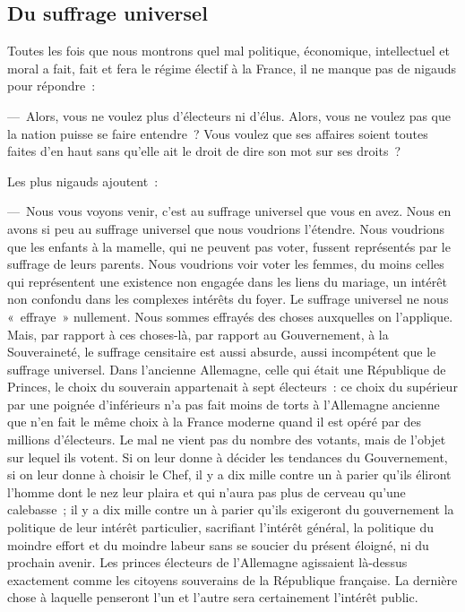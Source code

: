 \documentclass[french,twoside]{book} %
\begin{document}
\subsection[Du suffrage universel]{Du suffrage universel}
\noindent Toutes les fois que nous montrons quel mal politique, économique, intellectuel et moral a fait, fait et fera le régime électif à la France, il ne manque pas de nigauds pour répondre :\par
— Alors, vous ne voulez plus d’électeurs ni d’élus. Alors, vous ne voulez pas que la nation puisse se faire entendre ? Vous voulez que ses affaires soient toutes faites d’en haut sans qu’elle ait le droit de dire son mot sur ses droits ?\par
Les plus nigauds ajoutent :\par
— Nous vous voyons venir, c’est au suffrage universel que vous en avez. Nous en avons si peu au suffrage universel que nous voudrions l’étendre. Nous voudrions que les enfants à la mamelle, qui ne peuvent pas voter, fussent représentés par le suffrage de leurs parents. Nous voudrions voir voter les femmes, du moins celles qui représentent une existence non engagée dans les liens du mariage, un intérêt non confondu dans les complexes intérêts du foyer. Le suffrage universel ne nous « effraye » nullement. Nous sommes effrayés des choses auxquelles on l’applique. Mais, par rapport à ces choses-là, par rapport au Gouvernement, à la Souveraineté, le suffrage censitaire est aussi absurde, aussi incompétent que le suffrage universel. Dans l’ancienne Allemagne, celle qui était une République de Princes, le choix du souverain appartenait à sept électeurs : ce choix du supérieur par une poignée d’inférieurs n’a pas fait moins de torts à l’Allemagne ancienne que n’en fait le même choix à la France moderne quand il est opéré par des millions d’électeurs. Le mal ne vient pas du nombre des votants, mais de l’objet sur lequel ils votent. Si on leur donne à décider les tendances du Gouvernement, si on leur donne à choisir le Chef, il y a dix mille contre un à parier qu’ils éliront l’homme dont le nez leur plaira et qui n’aura pas plus de cerveau qu’une calebasse ; il y a dix mille contre un à parier qu’ils exigeront du gouvernement la politique de leur intérêt particulier, sacrifiant l’intérêt général, la politique du moindre effort et du moindre labeur sans se soucier du présent éloigné, ni du prochain avenir. Les princes électeurs de l’Allemagne agissaient là-dessus exactement comme les citoyens souverains de la République française. La dernière chose à laquelle penseront l’un et l’autre sera certainement l’intérêt public.\par
\end{document}
